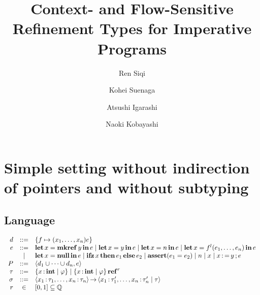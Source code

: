 \documentclass[runningheads]{llncs}
\begin{document}
%
\title{Context- and Flow-Sensitive Refinement Types for Imperative Programs}
%
%
\author{Ren Siqi \and Kohei Suenaga \and Atsushi Igarashi \and Naoki Kobayashi}
%
%
\institute{}
%
\maketitle              %
%
\begin{abstract}

\keywords{}
\end{abstract}
%
%
%

\section{Simple setting without indirection of pointers and without subtyping}

\subsection{Language}

\[
\begin{array}{rcl}  
  d &::=& \left\{{f \mapsto (x_1,\dots,x_n)e}\right\}\\
  e &::=& \operatorname{\mathbf{let}} x = \operatorname{\mathbf{mkref}} y \operatorname{\mathbf{in}} e \mid \operatorname{\mathbf{let}} x = y \operatorname{\mathbf{in}} e \mid \operatorname{\mathbf{let}} x = n \operatorname{\mathbf{in}} e \mid \operatorname{\mathbf{let}} x = f^l(e_1,\dots,e_n) \operatorname{\mathbf{in}} e\\
        &\mid& \operatorname{\mathbf{let}} x = \mathbf{null} \operatorname{\mathbf{in}} e \mid \operatorname{\mathbf{ifz}} x \operatorname{\mathbf{then}} e_1 \operatorname{\mathbf{else}} e_2 \mid \mathbf{assert}(e_1 = e_2) \mid n \mid x \mid x \operatorname{:=} y \operatorname{;} e\\
  P &::=& \left\langle{d_1 \cup \dots \cup d_n, e}\right\rangle\\
  \tau &::=& \left\{{x \operatorname{:} \mathbf{int} \mid \varphi}\right\} \mid \left\{{x \operatorname{:} \mathbf{int} \mid \varphi}\right\} \operatorname{\mathbf{ref}}^{r}\\
  \sigma &::=& \left\langle{x_1\operatorname{:}\tau_1,\dots,x_n\operatorname{:}\tau_n}\right\rangle\operatorname{\rightarrow}\left\langle{x_1\operatorname{:}\tau_1',\dots,x_n\operatorname{:}\tau_n' \mid \tau}\right\rangle\\
  r &\in& [0,1] \subseteq \mathbb{Q}\\
\end{array}
\]
\end{document}
